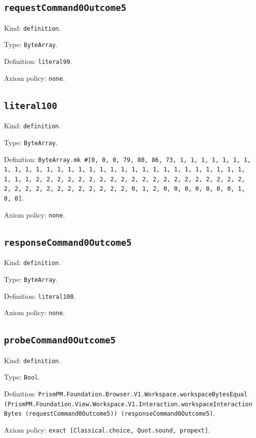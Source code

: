 \documentclass[11pt]{article}
\begin{document}
\subsection*{\texttt{requestCommand0Outcome5}}
\noindent Kind: \texttt{definition}.\par
\noindent Type: \texttt{ByteArray}.\par
\noindent Definition: \texttt{literal99}.\par
\noindent Axiom policy: \texttt{none}.\par
\subsection*{\texttt{literal100}}
\noindent Kind: \texttt{definition}.\par
\noindent Type: \texttt{ByteArray}.\par
\noindent Definition: \texttt{ByteArray.mk \#[0, 0, 0, 79, 80, 86, 73, 1, 1, 1, 1, 1, 1, 1, 1, 1, 1, 1, 1, 1, 1, 1, 1, 1, 1, 1, 1, 1, 1, 1, 1, 1, 1, 1, 1, 1, 1, 1, 1, 1, 2, 2, 2, 2, 2, 2, 2, 2, 2, 2, 2, 2, 2, 2, 2, 2, 2, 2, 2, 2, 2, 2, 2, 2, 2, 2, 2, 2, 2, 2, 2, 2, 0, 1, 2, 0, 0, 0, 0, 0, 0, 0, 1, 0, 0]}.\par
\noindent Axiom policy: \texttt{none}.\par
\subsection*{\texttt{responseCommand0Outcome5}}
\noindent Kind: \texttt{definition}.\par
\noindent Type: \texttt{ByteArray}.\par
\noindent Definition: \texttt{literal100}.\par
\noindent Axiom policy: \texttt{none}.\par
\subsection*{\texttt{probeCommand0Outcome5}}
\noindent Kind: \texttt{definition}.\par
\noindent Type: \texttt{Bool}.\par
\noindent Definition: \texttt{PrismPM.Foundation.Browser.V1.Workspace.workspaceBytesEqual (PrismPM.Foundation.View.Workspace.V1.Interaction.workspaceInteractionBytes (requestCommand0Outcome5)) (responseCommand0Outcome5)}.\par
\noindent Axiom policy: \texttt{exact [Classical.choice, Quot.sound, propext]}.\par
\end{document}
